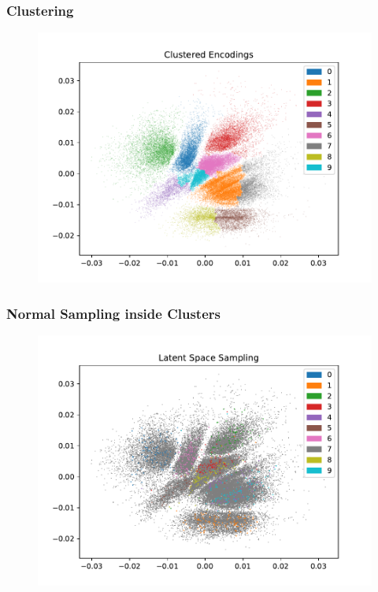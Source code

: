 \documentclass[10pt, usenames, dvipsnames, table]{beamer}
\begin{document}
\begin{frame}
  \frametitle{Clustering}
  \begin{figure}
    \centering
    \includegraphics[width=\linewidth]
    {models/mnist_student_e300_L2_b64/multi-normal-cluster_clustered_encodings}
    \caption{}
    \label{}
  \end{figure}
\end{frame}

\begin{frame}
  \frametitle{Normal Sampling inside Clusters}
  \begin{figure}
    \centering
    \includegraphics[width=\linewidth]
    {models/mnist_student_e300_L2_b64/multi-normal-cluster_sampling_1000}
    \caption{}
    \label{}
  \end{figure}
\end{frame}
\end{document}

